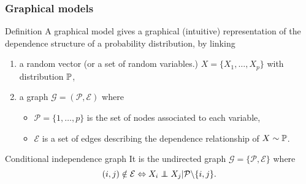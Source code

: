\begin{frame}
  \frametitle{Graphical models}
  \begin{block}{Definition}
    A graphical model gives  a graphical (intuitive) representation of
    the dependence structure of a probability distribution, by linking
    
    \begin{enumerate}
    \item a random  vector (or a set of random  variables.)  $X = \{X_1,
      \dots, X_p\}$ with distribution $\mathbb{P}$, \bigskip
    \item a graph $\mathcal{G} = (\mathcal{P}, \mathcal{E})$ where
      \begin{itemize}
      \item $\mathcal{P}=\{1,\dots,p\}$ is  the set of nodes associated
        to each variable,
      \item $\mathcal{E}$ is a  set of edges describing the dependence
        relationship of $X\sim \mathbb{P}$.
      \end{itemize}
    \end{enumerate}
   \end{block}

   \vfill

  \begin{block}{Conditional independence graph} It is the \alert{undirected}  graph $\mathcal{G} =
    \{\mathcal{P},    \mathcal{E}\}$ where
    \begin{equation*}
      (i,j) \notin \mathcal{E} \Leftrightarrow X_i \indep X_j | \mathcal{P} \backslash
      \{i,j\}.
    \end{equation*}
  \end{block}

\end{frame}

